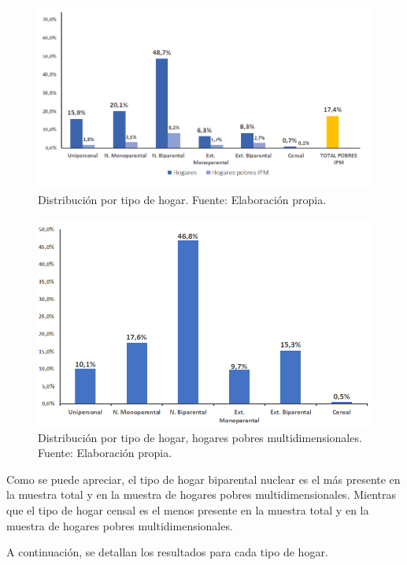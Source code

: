 \documentclass[12pt,letterpaper,spanish]{article}
\begin{document}
\begin{figure}[H]
    \centering
    \includegraphics[width=\textwidth]{Max/distribucion_tipo_hogar_casen.png}
    \caption{Distribución por tipo de hogar. Fuente: Elaboración propia.}
    \label{distHogarTotal}
\end{figure}

\begin{figure}[H]
    \centering
    \includegraphics[width=\textwidth]{Max/distribucion_hog_pobres_por_tipo_hogar.png}
    \caption{Distribución por tipo de hogar, hogares pobres multidimensionales. Fuente: Elaboración propia.}
    \label{distHogarpobres}
\end{figure}
Como se puede apreciar, el tipo de hogar biparental nuclear es el más presente en la muestra total y en la muestra de hogares pobres multidimensionales. Mientras que el tipo de hogar censal es el menos presente en la muestra total y en la muestra de hogares pobres multidimensionales. 

A continuación, se detallan los resultados para cada tipo de hogar.
\end{document}
